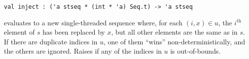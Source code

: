 \begin{cluster}
\label{grp:gr:st-seq-interface:inject}

\begin{gram}[inject]
\label{gr:st-seq-interface:inject}
\begin{verbatim}
val inject : ('a stseq * (int * 'a) Seq.t) -> 'a stseq
\end{verbatim}
 evaluates to a new single-threaded sequence where, for
each $(i,x) \in u$, the $i^\text{th}$ element of $s$ has been replaced by $x$,
but all other elements are the same as in $s$. If there are duplicate indices
in $u$, one of them ``wins'' non-deterministically, and the others are ignored.
Raises  if any of the indices in $u$ is out-of-bounds.

\end{gram}
\end{cluster}

